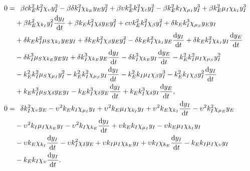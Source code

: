 \documentclass[12pt]{article}
\begin{document}
\begin{align}
0 =&\textcolor{white}{-}\beta c k_{E}^{2} k_{I}^{2} \chi_{\upsilon} y_{I}^{2} - \beta \delta k_{I}^{2} \chi_{k_{E}} y_{E} y_{I}^{2} + \beta \upsilon k_{E}^{2} k_{I}^{2} \chi_{c} y_{I}^{2} - \beta k_{E}^{2} k_{I} \chi_{\mu_{I}} y_{I}^{3} + \beta k_{E}^{2} \mu_{I} \chi_{k_{I}} y_{I}^{3} \nonumber\\
&+ \beta k_{E}^{2} \chi_{k_{I}} y_{I}^{2} \dfrac{\mathrm{d}y_{I}}{\mathrm{d}t} + \beta k_{E} k_{I}^{2} \chi_{\delta} y_{E} y_{I}^{2} + c \upsilon k_{E}^{2} k_{I}^{2} \chi_{\beta} y_{I}^{2} + \delta k_{E} k_{I}^{3} \chi_{\mu_{S}} y_{E} y_{I} \nonumber\\
&+ \delta k_{E} k_{I}^{2} \mu_{S} \chi_{k_{I}} y_{E} y_{I} + \delta k_{E} k_{I}^{2} \chi_{\beta} y_{E} y_{I}^{2} - \delta k_{E} k_{I}^{2} \chi_{k_{I}} y_{E} \dfrac{\mathrm{d}y_{I}}{\mathrm{d}t} + \delta k_{E} k_{I}^{2} \chi_{k_{I}} y_{I} \dfrac{\mathrm{d}y_{E}}{\mathrm{d}t} \nonumber\\
&- \delta k_{I}^{3} \mu_{S} \chi_{k_{E}} y_{E} y_{I} + \delta k_{I}^{3} \chi_{k_{E}} y_{E} \dfrac{\mathrm{d}y_{I}}{\mathrm{d}t} - \delta k_{I}^{3} \chi_{k_{E}} y_{I} \dfrac{\mathrm{d}y_{E}}{\mathrm{d}t} - k_{E}^{2} k_{I}^{2} \mu_{I} \chi_{\mu_{S}} y_{I}^{2} \nonumber\\
&- k_{E}^{2} k_{I}^{2} \mu_{S} \chi_{\mu_{I}} y_{I}^{2} - k_{E}^{2} k_{I}^{2} \chi_{\mu_{S}} y_{I} \dfrac{\mathrm{d}y_{I}}{\mathrm{d}t} - k_{E}^{2} k_{I} \mu_{I} \chi_{\beta} y_{I}^{3} - k_{E}^{2} k_{I} \chi_{\beta} y_{I}^{2} \dfrac{\mathrm{d}y_{I}}{\mathrm{d}t} \nonumber\\
&+ k_{E} k_{I}^{3} \mu_{S} \chi_{\delta} y_{E} y_{I} - k_{E} k_{I}^{3} \chi_{\delta} y_{E} \dfrac{\mathrm{d}y_{I}}{\mathrm{d}t} + k_{E} k_{I}^{3} \chi_{\delta} y_{I} \dfrac{\mathrm{d}y_{E}}{\mathrm{d}t},\label{eq:lin_sym_SEI_1_app}\\
0 =&\textcolor{white}{-}\delta k_{I}^{2} \chi_{\upsilon} y_{E} - \upsilon^{2} k_{E} k_{I} \chi_{\mu_{I}} y_{I} + \upsilon^{2} k_{E} \mu_{I} \chi_{k_{I}} y_{I} + \upsilon^{2} k_{E} \chi_{k_{I}} \dfrac{\mathrm{d}y_{I}}{\mathrm{d}t} - \upsilon^{2} k_{I}^{2} \chi_{\mu_{E}} y_{E} \nonumber\\
&- \upsilon^{2} k_{I} \mu_{I} \chi_{k_{E}} y_{I} - \upsilon^{2} k_{I} \chi_{k_{E}} \dfrac{\mathrm{d}y_{I}}{\mathrm{d}t} + \upsilon k_{E} k_{I} \chi_{\mu_{I}} y_{I} - \upsilon k_{E} \mu_{I} \chi_{k_{I}} y_{I} \nonumber\\
&- \upsilon k_{E} \chi_{k_{I}} \dfrac{\mathrm{d}y_{I}}{\mathrm{d}t} - \upsilon k_{I}^{2} \chi_{\delta} y_{E} + \upsilon k_{I} \mu_{I} \chi_{k_{E}} y_{I} + \upsilon k_{I} \chi_{k_{E}} \dfrac{\mathrm{d}y_{I}}{\mathrm{d}t} - k_{E} k_{I} \mu_{I} \chi_{\upsilon} y_{I}\nonumber\\
&- k_{E} k_{I} \chi_{\upsilon} \dfrac{\mathrm{d}y_{I}}{\mathrm{d}t}.\label{eq:lin_sym_SEI_2_app}
\end{align}
\end{document}
